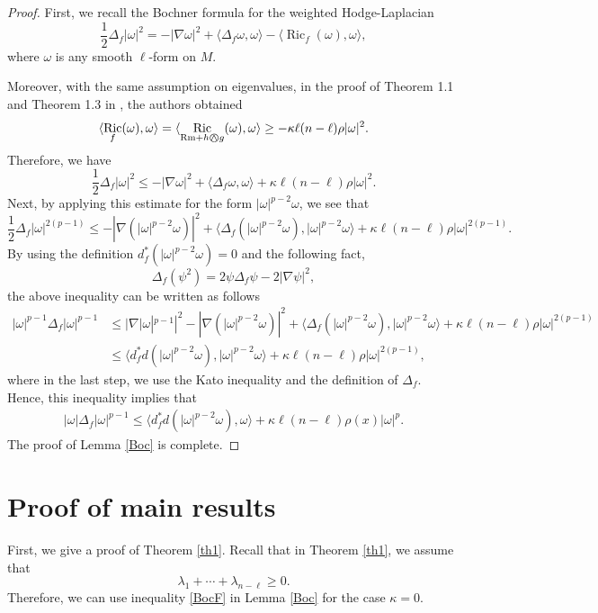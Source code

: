 \documentclass[10pt,a4paper]{amsart}
\numberwithin{equation}{section}
\newcommand{\KN}{\mathbin{\bigcirc\mspace{-15mu}\wedge\mspace{3mu}}}
\DeclareMathOperator{\Ric}{Ric}
\begin{document}
\begin{proof}
	First, we recall the Bochner formula for the weighted Hodge-Laplacian
	$$\frac{1}{2}\Delta_f |\omega|^2=-|\nabla \omega|^2 + \langle \Delta_f \omega, \omega \rangle- \langle \Ric_f (\omega), \omega \rangle,$$
	where $\omega$ is any smooth $\ell$-form on $M$.
	
	Moreover, with the same assumption on eigenvalues, in the proof of Theorem 1.1 and Theorem 1.3 in \cite{DDH25}, the authors obtained 
	$$ \langle \Ric_f (\omega), \omega \rangle= \langle \Ric_{\mathrm{Rm}+h \KN g} (\omega), \omega \rangle \ge -\kappa \ell (n-\ell)\rho |\omega|^2 .$$
	Therefore, we have $$\frac{1}{2}\Delta_f |\omega|^2\le-|\nabla \omega|^2 + \langle \Delta_f \omega, \omega \rangle +\kappa \ell (n-\ell)\rho |\omega|^2.$$
	Next, by applying this estimate for the form $|\omega|^{p-2}\omega$, we see that
	$$\frac{1}{2}\Delta_f |\omega|^{2(p-1)}\le-|\nabla (|\omega|^{p-2}\omega)|^2 +  \langle \Delta_f (|\omega|^{p-2}\omega), |\omega|^{p-2}\omega \rangle +\kappa \ell (n-\ell)\rho |\omega|^{2(p-1)}.$$
	By using the definition $d^*_f(|\omega|^{p-2}\omega)=0$ and the following fact, $$\Delta_f(\psi ^2) = 2 \psi \Delta_f \psi -2|\nabla \psi|^2,$$ 
    the above inequality can be written as follows
	\begin{align*}\nonumber
		|\omega|^{p-1}\Delta_f|\omega|^{p-1} 
&	\le |\nabla |\omega|^{p-1}|^2{-} |\nabla(|\omega|^{p-2}\omega)|^2 + \langle \Delta_f (|\omega|^{p-2}\omega), |\omega|^{p-2}\omega \rangle +\kappa \ell (n{-}\ell)\rho |\omega|^{2(p-1)}\\\nonumber
&\le \langle d^*_f d (|\omega|^{p-2}\omega), |\omega|^{p-2}\omega \rangle +\kappa \ell (n-\ell)\rho |\omega|^{2(p-1)},
	\end{align*}
	where in the last step, we use the Kato inequality and the definition of $\Delta_f$.
	Hence, this inequality implies that
	\begin{align*}
	|\omega| \Delta_f |\omega|^{p-1} \le \langle d^*_f d (|\omega|^{p-2}\omega), \omega \rangle +\kappa \ell (n-\ell) \rho(x)|\omega|^p.
\end{align*}
The proof of Lemma \ref{Boc} is complete.
\end{proof}



\section{Proof of main results}

First, we give a proof of Theorem \ref{th1}. Recall that in Theorem \ref{th1}, we assume that $$\lambda_1+\cdots+\lambda_{n-\ell}\ge 0	.$$ Therefore, we can use inequality \eqref{BocF} in Lemma \ref{Boc}  for the case $\kappa=0$.
\end{document}
